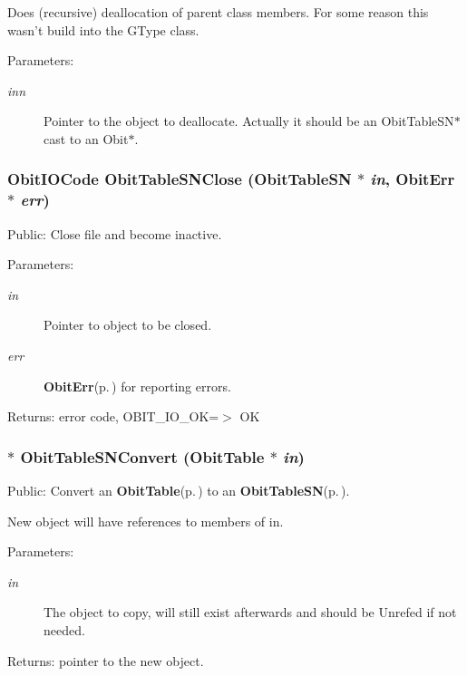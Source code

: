 Does (recursive) deallocation of parent class members. For some reason this wasn't build into the GType class. \begin{Desc}
\item[Parameters:]
\begin{description}
\item[{\em inn}]Pointer to the object to deallocate. Actually it should be an Obit\-Table\-SN$\ast$ cast to an Obit$\ast$. \end{description}
\end{Desc}
\subsubsection{\setlength{\rightskip}{0pt plus 5cm}Obit\-IOCode Obit\-Table\-SNClose ({\bf Obit\-Table\-SN} $\ast$ {\em in}, {\bf Obit\-Err} $\ast$ {\em err})}\label{ObitTableSN_8c_a25}


Public: Close file and become inactive. 

\begin{Desc}
\item[Parameters:]
\begin{description}
\item[{\em in}]Pointer to object to be closed. \item[{\em err}]{\bf Obit\-Err}{\rm (p.\,\pageref{structObitErr})} for reporting errors. \end{description}
\end{Desc}
\begin{Desc}
\item[Returns:]error code, OBIT\_\-IO\_\-OK=$>$ OK \end{Desc}
\subsubsection{$\ast$ Obit\-Table\-SNConvert ({\bf Obit\-Table} $\ast$ {\em in})}\label{ObitTableSN_8c_a19}


Public: Convert an {\bf Obit\-Table}{\rm (p.\,\pageref{structObitTable})} to an {\bf Obit\-Table\-SN}{\rm (p.\,\pageref{structObitTableSN})}. 

New object will have references to members of in. \begin{Desc}
\item[Parameters:]
\begin{description}
\item[{\em in}]The object to copy, will still exist afterwards and should be Unrefed if not needed. \end{description}
\end{Desc}
\begin{Desc}
\item[Returns:]pointer to the new object. \end{Desc}
